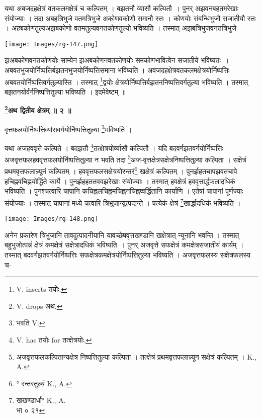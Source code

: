 \documentclass[11pt, openany]{book}
\begin{document}
 यथा अबजदहक्षेत्रं वतकलमक्षेत्रं च कल्पितम् । बझतनौ व्यासौ कल्पितौ~। पुनर् अझवनबहतमरेखाः संयोज्याः । तदा अबहत्रिभुजे वतमत्रिभुजे अकोणवकोणौ समानौ स्तः । कोणयोः संबन्धिभुजौ सजातीयौ स्तः । अहबकोणतुल्यअझबकोणो वतमतुल्यवनतकोणतुल्यो भविष्यति । तस्मात् अझबत्रिभुजवनतत्रिभुजे
\begin{center}
\noindent \texttt{[image: Images/rg-147.png]}  
\end{center}
झअबकोणवनतकोणयोः साम्येन झअबकोणनवतकोणयोः समकोणभावित्वेन सजातीये भविष्यतः~। अबवतभुजयोर्निष्पत्तिर्बझतनभुजयोर्निष्पत्तिसमाना भविष्यति ।
अवजदहक्षेत्रवतकलमक्षेत्रयोर्निष्पत्तिः अबवतयोर्निष्पत्तिवर्गतुल्यास्ति । तस्मात्  \renewcommand{\thefootnote}{३}\footnote{{\en V. inserts} तयोः. }द्वयोः
क्षेत्रयोर्निष्पत्तिर्बझतननिष्पत्तिवर्गतुल्या भविष्यति । तस्मात्
बझतनयोर्वर्गनिष्पत्तितुल्या भविष्यति । इदमेवेष्टम् ॥\\
\begin{center}
\textbf{\large \renewcommand{\thefootnote}{४}\footnote{{\en V. drops} अथ.}अथ द्वितीय क्षेत्रम् ॥ २ ॥}
\end{center}
\vspace{2mm}

{\ab वृत्तफलयोर्निष्पत्तिर्व्यासवर्गयोर्निष्पत्तितुल्या  \renewcommand{\thefootnote}{५}\footnote{भवति {\en V.}}भविष्यति ।}

\newpage
यथा अजहववृत्ते कल्पिते । बदझतौ \renewcommand{\thefootnote}{१}\footnote{{\en V. has} तयोः {\en for} तत्क्षेत्रयोः,}तत्क्षेत्रयोर्व्यासौ
कल्पितौ । यदि बदवर्गझतवर्गयोर्निष्पत्तिः अजवृत्तफलहववृत्तफलयोर्निष्पत्तितुल्या न भवति तदा \renewcommand{\thefootnote}{२}\footnote{अजवृत्तफलकल्पितान्यक्षेत्र निष्पत्तितुल्या कल्पिता । तत्क्षेत्रं प्रथमवृत्तफलान्न्यून सक्षेत्रं
कल्पितम् । {\en K., A.}}अज-वृत्तक्षेत्रसक्षेत्रनिष्पत्तितुल्या
कल्पिता । सक्षेत्रं प्रथमवृत्तफलान्न्यूनं कल्पितम् । हववृत्तफलसक्षेत्रयोरन्तरं\renewcommand{\thefootnote}{३}\footnote{° रन्तरतुल्यं {\en K., A.} }
खक्षेत्रं कल्पितम् । पुनर्झहतचापझवतचापे हचिह्नवचिह्नयोर्द्धिते कार्ये । पुनर्झहहततववझरेखाः संयोज्याः । तस्मात् हवक्षेत्रं हववृत्तार्द्धफलादधिकं भविष्यति । पुनश्चत्वारि चापानि
कचिह्नलचिह्नमचिह्ननचिह्नष्वर्द्धितानि कार्याणि । एतेषां चापानां पूर्णज्याः संयोज्याः ।
तस्मात् चापानां मध्ये चत्वारि त्रिभुजान्युत्पद्यन्ते । प्रत्येकं क्षेत्रं \renewcommand{\thefootnote}{४}\footnote{खखण्डार्धा° {\en K., A.}\\
 भा ० २१}खार्द्धादधिकं भविष्यति ।
\begin{center}
\texttt{[image: Images/rg-148.png]}  
\end{center}

अनेन प्रकारेण त्रिभुजानि तावदुत्पादनीयानि यावच्छेषवृत्तखण्डानि खक्षेत्रात् न्यूनानि भवन्ति । तस्मात् बहुभुजोत्पन्नं क्षेत्रं कमक्षेत्रं सक्षेत्रादधिकं भविष्यति~। पुनर् अजवृत्ते
सफक्षेत्रं कमक्षेत्रसजातीयं कार्यम् । तस्मात् बदवर्गझतवर्गयोर्निष्पत्तिः
सफक्षेत्रकमक्षेत्रयोर्निष्पत्तितुल्या भविष्यति । अजवृत्तफलस्य सक्षेत्रफलस्य च-
\end{document}
